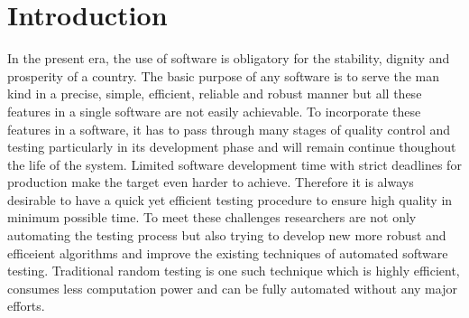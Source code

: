 \section{Introduction}
In the present era, the use of software is obligatory for the stability, dignity and  prosperity of a country. The basic purpose of any software is to serve the man kind in a  precise, simple, efficient, reliable and robust manner but all these features in a single software are not easily achievable. To incorporate these features in a software, it has to pass through many stages of quality control and testing particularly in its development phase and will remain continue thoughout the life of the system. Limited software development time with strict deadlines for production make the target even harder to achieve. Therefore it is always desirable to have a quick yet efficient testing procedure to ensure high quality in minimum possible time. To meet these challenges researchers are not only automating the testing process but also trying to develop new more robust and efficeient algorithms and improve the existing techniques of automated software testing. Traditional random testing is one such technique which is highly efficient, consumes less computation power and can be fully automated without any major efforts.\\

